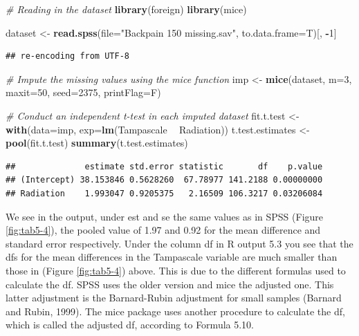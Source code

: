 \documentclass[]{book}
\newenvironment{Shaded}{\begin{snugshade}}{\end{snugshade}}
\newcommand{\KeywordTok}[1]{\textcolor[rgb]{0.13,0.29,0.53}{\textbf{#1}}}
\newcommand{\DataTypeTok}[1]{\textcolor[rgb]{0.13,0.29,0.53}{#1}}
\newcommand{\DecValTok}[1]{\textcolor[rgb]{0.00,0.00,0.81}{#1}}
\newcommand{\StringTok}[1]{\textcolor[rgb]{0.31,0.60,0.02}{#1}}
\newcommand{\CommentTok}[1]{\textcolor[rgb]{0.56,0.35,0.01}{\textit{#1}}}
\newcommand{\OperatorTok}[1]{\textcolor[rgb]{0.81,0.36,0.00}{\textbf{#1}}}
\newcommand{\NormalTok}[1]{#1}
\theoremstyle{definition}
\theoremstyle{definition}
\theoremstyle{definition}
\theoremstyle{remark}
\begin{document}
\begin{Shaded}
\begin{Highlighting}[]
\CommentTok{# Reading in the dataset}
\KeywordTok{library}\NormalTok{(foreign)}
\KeywordTok{library}\NormalTok{(mice)}

\NormalTok{dataset <-}\StringTok{ }\KeywordTok{read.spss}\NormalTok{(}\DataTypeTok{file=}\StringTok{"Backpain 150 missing.sav"}\NormalTok{, }\DataTypeTok{to.data.frame=}\NormalTok{T)[, }\OperatorTok{-}\DecValTok{1}\NormalTok{]}
\end{Highlighting}
\end{Shaded}

\begin{verbatim}
## re-encoding from UTF-8
\end{verbatim}

\begin{Shaded}
\begin{Highlighting}[]
\CommentTok{# Impute the missing values using the mice function }
\NormalTok{imp <-}\StringTok{ }\KeywordTok{mice}\NormalTok{(dataset, }\DataTypeTok{m=}\DecValTok{3}\NormalTok{, }\DataTypeTok{maxit=}\DecValTok{50}\NormalTok{, }\DataTypeTok{seed=}\DecValTok{2375}\NormalTok{, }\DataTypeTok{printFlag=}\NormalTok{F)}
 
\CommentTok{# Conduct an independent t-test in each imputed dataset}
\NormalTok{fit.t.test <-}\StringTok{ }\KeywordTok{with}\NormalTok{(}\DataTypeTok{data=}\NormalTok{imp, }\DataTypeTok{exp=}\KeywordTok{lm}\NormalTok{(Tampascale }\OperatorTok{~}\StringTok{ }\NormalTok{Radiation))}
\NormalTok{t.test.estimates <-}\StringTok{ }\KeywordTok{pool}\NormalTok{(fit.t.test)}
\KeywordTok{summary}\NormalTok{(t.test.estimates)}
\end{Highlighting}
\end{Shaded}

\begin{verbatim}
##              estimate std.error statistic       df    p.value
## (Intercept) 38.153846 0.5628260  67.78977 141.2188 0.00000000
## Radiation    1.993047 0.9205375   2.16509 106.3217 0.03206084
\end{verbatim}

We see in the output, under est and se the same values as in SPSS
(Figure \ref{fig:tab5-4}), the pooled value of 1.97 and 0.92 for the
mean difference and standard error respectively. Under the column df in
R output 5.3 you see that the dfs for the mean differences in the
Tampascale variable are much smaller than those in (Figure
\ref{fig:tab5-4}) above. This is due to the different formulas used to
calculate the df. SPSS uses the older version and mice the adjusted one.
This latter adjustment is the Barnard-Rubin adjustment for small samples
(Barnard and Rubin, 1999). The mice package uses another procedure to
calculate the df, which is called the adjusted df, according to Formula
5.10.
\end{document}
